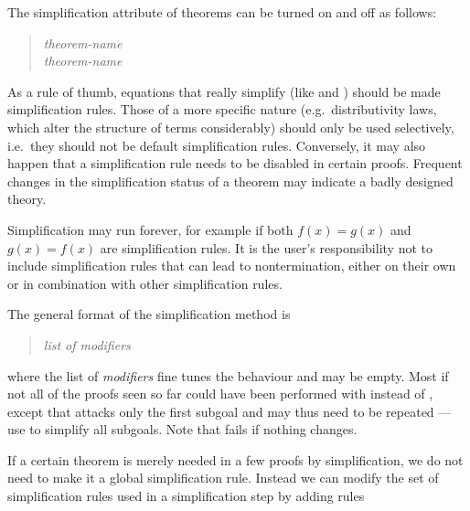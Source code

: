 \begin{isabellebody}
\begin{isamarkuptext}
The simplification attribute of theorems can be turned on and off as follows:
\begin{quote}
 \textit{theorem-name}\\
 \textit{theorem-name}
\end{quote}
As a rule of thumb, equations that really simplify (like  and ) should be made simplification
rules.  Those of a more specific nature (e.g.\ distributivity laws, which
alter the structure of terms considerably) should only be used selectively,
i.e.\ they should not be default simplification rules.  Conversely, it may
also happen that a simplification rule needs to be disabled in certain
proofs.  Frequent changes in the simplification status of a theorem may
indicate a badly designed theory.
\begin{warn}
  Simplification may run forever, for example if both $f(x) = g(x)$ and
  $g(x) = f(x)$ are simplification rules. It is the user's responsibility not
  to include simplification rules that can lead to nontermination, either on
  their own or in combination with other simplification rules.
\end{warn}%
\end{isamarkuptext}%
%
%
\begin{isamarkuptext}%
The general format of the simplification method is
\begin{quote}
 \textit{list of modifiers}
\end{quote}
where the list of \emph{modifiers} fine tunes the behaviour and may
be empty. Most if not all of the proofs seen so far could have been performed
with  instead of , except that  attacks
only the first subgoal and may thus need to be repeated --- use
 to simplify all subgoals.
Note that  fails if nothing changes.%
\end{isamarkuptext}%
%
%
\begin{isamarkuptext}%
If a certain theorem is merely needed in a few proofs by simplification,
we do not need to make it a global simplification rule. Instead we can modify
the set of simplification rules used in a simplification step by adding rules

\end{isamarkuptext}
\end{isabellebody}
